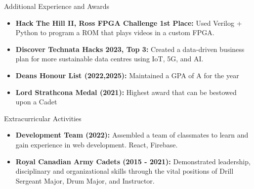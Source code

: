 \documentclass[]{mcdowellcv}
\begin{document}
	\begin{cvsection}{Additional Experience and Awards}
		\begin{cvsubsection}{}{}{}	
			\begin{itemize}
				\item \textbf{Hack The Hill II, Ross FPGA Challenge 1st Place:} Used Verilog + Python to program a ROM that plays videos in a custom FPGA. 
				\item \textbf{Discover Technata Hacks 2023, Top 3:} Created a data-driven business plan for more sustainable data centres using IoT, 5G, and AI.  
				\item \textbf{Deans Honour List (2022,2025):} Maintained a GPA of A for the year
				\item \textbf{Lord Strathcona Medal (2021):} Highest award that can be bestowed upon a Cadet
			\end{itemize}
		\end{cvsubsection}
	\end{cvsection}
	
	\begin{cvsection}{Extracurricular Activities}
		\begin{cvsubsection}{}{}{}
			\begin{itemize}
				\item \textbf{Development Team (2022):} Assembled a team of classmates to learn and gain experience in web development. React, Firebase.
				\item \textbf{Royal Canadian Army Cadets (2015 - 2021):} Demonstrated leadership, disciplinary and organizational skills through the vital positions of Drill Sergeant Major, Drum Major, and Instructor.
			\end{itemize}
		\end{cvsubsection}
	\end{cvsection}
\end{document}
